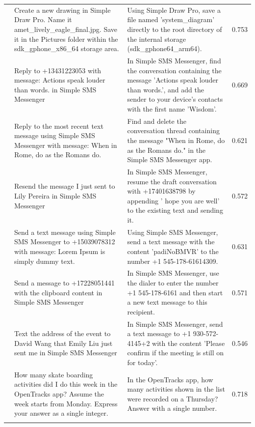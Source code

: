\documentclass{article} %
\begin{document}
\begin{scriptsize}
\begin{longtable}{@{} c >{\raggedright\arraybackslash}p{} >{\raggedright\arraybackslash}p{} c @{}}
\addlinespace[2pt]
81 & Create a new drawing in Simple Draw Pro. Name it amet\_lively\_eagle\_final.jpg. Save it in the Pictures folder within the sdk\_gphone\_x86\_64 storage area. & Using Simple Draw Pro, save a file named 'system\_diagram' directly to the root directory of the internal storage (sdk\_gphone64\_arm64). & 0.753 \\
\addlinespace[2pt]
82 & Reply to +13431223053 with message: Actions speak louder than words. in Simple SMS Messenger & In Simple SMS Messenger, find the conversation containing the message 'Actions speak louder than words.', and add the sender to your device's contacts with the first name 'Wisdom'. & 0.669 \\
\addlinespace[2pt]
83 & Reply to the most recent text message using Simple SMS Messenger with message: When in Rome, do as the Romans do. & Find and delete the conversation thread containing the message "When in Rome, do as the Romans do." in the Simple SMS Messenger app. & 0.621 \\
\addlinespace[2pt]
84 & Resend the message I just sent to Lily Pereira in Simple SMS Messenger & In Simple SMS Messenger, resume the draft conversation with +17401638798 by appending ' hope you are well' to the existing text and sending it. & 0.572 \\
\addlinespace[2pt]
85 & Send a text message using Simple SMS Messenger to +15039078312 with message: Lorem Ipsum is simply dummy text. & Using Simple SMS Messenger, send a text message with the content 'padiNoBMVR' to the number +1 545-178-61614309. & 0.631 \\
\addlinespace[2pt]
86 & Send a message to +17228051441 with the clipboard content in Simple SMS Messenger & In Simple SMS Messenger, use the dialer to enter the number +1 545-178-6161 and then start a new text message to this recipient. & 0.571 \\
\addlinespace[2pt]
87 & Text the address of the event to David Wang that Emily Liu just sent me in Simple SMS Messenger & In Simple SMS Messenger, send a text message to +1 930-572-4145+2 with the content 'Please confirm if the meeting is still on for today'. & 0.546 \\
\addlinespace[2pt]
88 & How many skate boarding activities did I do this week in the OpenTracks app? Assume the week starts from Monday. Express your answer as a single integer. & In the OpenTracks app, how many activities shown in the list were recorded on a Thursday? Answer with a single number. & 0.718 \\
\addlinespace[2pt]

\end{longtable}
\end{scriptsize}
\end{document}
